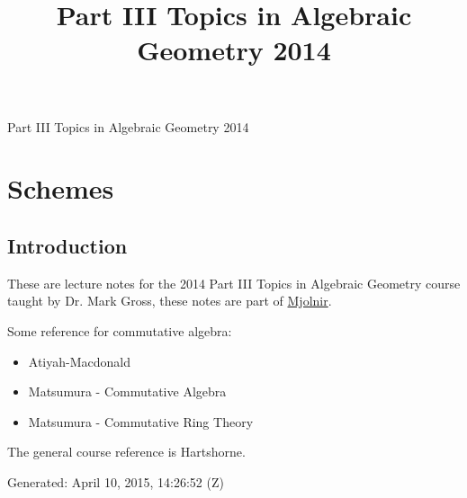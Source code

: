 \documentclass[10pt,]{book}
\title{Part III Topics in Algebraic Geometry 2014}
\author{}
\date{}
\theoremstyle{plain}
\theoremstyle{definition}
\numberwithin{equation}{section}
\begin{document}
\frontmatter
\thispagestyle{empty}
\begin{center}
{\Huge Part III Topics in Algebraic Geometry 2014}
\end{center}\par
{}
\clearpage
\thispagestyle{empty}
\clearpage
\maketitle
\clearpage
\thispagestyle{empty}
\clearpage
\setcounter{tocdepth}{1}
\renewcommand*\contentsname{Contents}
\tableofcontents
\mainmatter
\typeout{************************************************}
\typeout{************************************************}
\chapter[Schemes]{Schemes}\label{chap-schemes}
\typeout{************************************************}
\typeout{************************************************}
\section[Introduction]{Introduction}\label{sec-introduction}
These are lecture notes for the 2014 Part III Topics in Algebraic Geometry course taught by Dr. Mark Gross, these notes are part of \href{https://alexjbest.github.io/mjolnir/}{Mjolnir}.%
\par
Some reference for commutative algebra:
          \begin{itemize}
\item{}Atiyah-Macdonald\item{}Matsumura - Commutative Algebra \item{}Matsumura - Commutative Ring Theory\end{itemize}

          The general course reference is Hartshorne.
\par

          Generated: April 10, 2015, 14:26:52 (Z)
\typeout{************************************************}
\typeout{************************************************}
\end{document}
